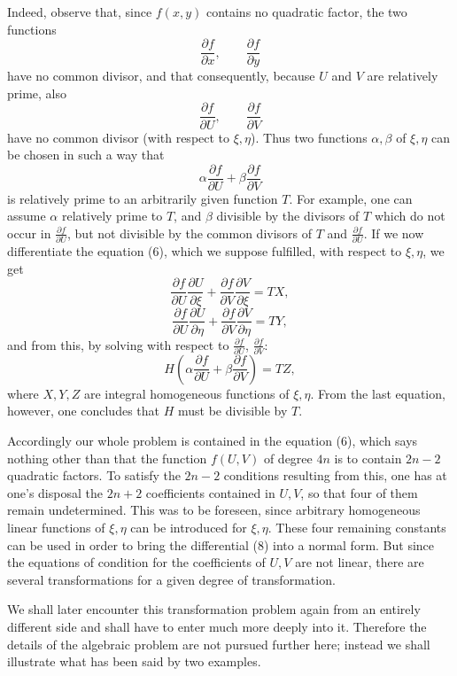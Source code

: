 \documentclass[11pt]{article}
\begin{document}
Indeed, observe that, since $f(x,y)$ contains no quadratic factor, the two functions
\[
\frac{\partial f}{\partial x},\qquad \frac{\partial f}{\partial y}
\]
have no common divisor, and that consequently, because $U$ and $V$ are relatively prime, also
\[
\frac{\partial f}{\partial U},\qquad \frac{\partial f}{\partial V}
\]
have no common divisor (with respect to $\xi,\eta$). Thus two functions $\alpha,\beta$ of $\xi,\eta$ can be chosen in such a way that
\[
\alpha\frac{\partial f}{\partial U}+\beta\frac{\partial f}{\partial V}
\]
is relatively prime to an arbitrarily given function $T$. For example, one can assume $\alpha$ relatively prime to $T$, and $\beta$ divisible by the divisors of $T$ which do not occur in $\frac{\partial f}{\partial U}$, but not divisible by the common divisors of $T$ and $\frac{\partial f}{\partial U}$. If we now differentiate the equation (6), which we suppose fulfilled, with respect to $\xi,\eta$, we get
\[
\frac{\partial f}{\partial U}\frac{\partial U}{\partial\xi}
+\frac{\partial f}{\partial V}\frac{\partial V}{\partial\xi}=TX,
\]
\[
\frac{\partial f}{\partial U}\frac{\partial U}{\partial\eta}
+\frac{\partial f}{\partial V}\frac{\partial V}{\partial\eta}=TY,
\]
and from this, by solving with respect to $\frac{\partial f}{\partial U}$, $\frac{\partial f}{\partial V}$:
\[
H\left(\alpha\frac{\partial f}{\partial U}+\beta\frac{\partial f}{\partial V}\right)=TZ,
\]
where $X,Y,Z$ are integral homogeneous functions of $\xi,\eta$. From the last equation, however, one concludes that $H$ must be divisible by $T$.

Accordingly our whole problem is contained in the equation (6), which says nothing other than that the function $f(U,V)$ of degree $4n$ is to contain $2n-2$ quadratic factors. To satisfy the $2n-2$ conditions resulting from this, one has at one's disposal the $2n+2$ coefficients contained in $U,V$, so that four of them remain undetermined. This was to be foreseen, since arbitrary homogeneous linear functions of $\xi,\eta$ can be introduced for $\xi,\eta$. These four remaining constants can be used in order to bring the differential (8) into a normal form. But since the equations of condition for the coefficients of $U,V$ are not linear, there are several transformations for a given degree of transformation.

We shall later encounter this transformation problem again from an entirely different side and shall have to enter much more deeply into it. Therefore the details of the algebraic problem are not pursued further here; instead we shall illustrate what has been said by two examples.
\end{document}
